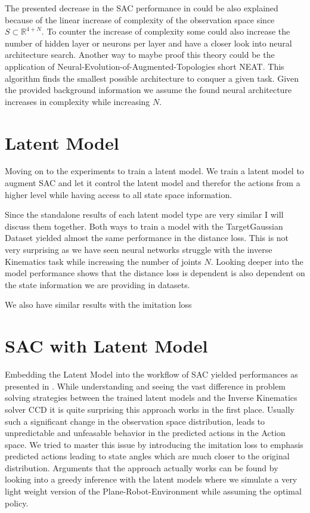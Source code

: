 The presented decrease in the SAC performance in  could be also explained because of the linear increase of complexity of the observation space since $S \subset \mathbb{R}^{4+N}$. To counter the increase of complexity some could also increase the number of hidden layer or neurons per layer and have a closer look into neural architecture search. Another way to maybe proof this theory could be the application of Neural-Evolution-of-Augmented-Topologies short NEAT. This algorithm finds the smallest possible architecture to conquer a given task. Given the provided background information we assume the found neural architecture increases in complexity while increasing $N$. 

\section{Latent Model}

Moving on to the experiments to train a latent model. We train a latent model to augment SAC and let it control the latent model and therefor the actions from a higher level while having access to all state space information.

Since the standalone results of each latent model type are very similar I will discuss them together.
Both ways to train a model with the TargetGaussian Dataset yielded almost the same performance in the distance loss. This is not very surprising as we have seen neural networks struggle with the inverse Kinematics task while increasing the number of joints $N$. Looking deeper into the model performance shows that the distance loss is dependent is also dependent on the state information we are providing in datasets.    

We also have similar results with the imitation loss


\section{SAC with Latent Model}

Embedding the Latent Model into the workflow of SAC yielded performances as presented in . While understanding and seeing the vast difference in problem solving strategies between the trained latent models and the Inverse Kinematics solver CCD it is quite surprising this approach works in the first place. Usually such a significant change in the observation space distribution, leads to unpredictable and unfeasable behavior in the predicted actions in the Action space. We tried to master this issue by introducing the imitation loss to emphasis predicted actions leading to state angles which are much closer to the original distribution.  Arguments that the approach actually works can be found by looking into a greedy inference with the latent models where we simulate a very light weight version of the Plane-Robot-Environment while assuming the optimal policy. 